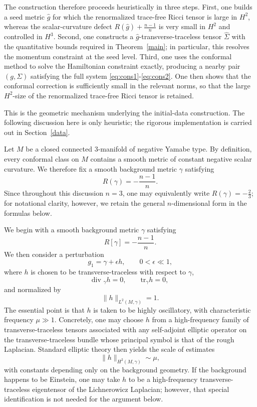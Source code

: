 \documentclass{amsart}
\renewcommand{\div}{\mbox{div }}
\newcommand{\tr}{\mbox{tr}}
\begin{document}
\noindent The construction therefore proceeds heuristically in three steps. First, one builds a seed metric \(\widehat g\) for which the renormalized trace-free Ricci tensor is large in \(H^{2}\), whereas the scalar-curvature defect \(R(\widehat g)+\frac{n-1}{n}\) is very small in \(H^{2}\) and controlled in \(H^{3}\). Second, one constructs a \(\widehat g\)-transverse-traceless tensor \(\widehat\Sigma\) with the quantitative bounds required in Theorem~\ref{main}; in particular, this resolves the momentum constraint at the seed level. Third, one uses the conformal method to solve the Hamiltonian constraint exactly, producing a nearby pair \((g,\Sigma)\) satisfying the full system \eqref{eq:cons1}-\eqref{eq:cons2}. One then shows that the conformal correction is sufficiently small in the relevant norms, so that the large \(H^{2}\)-size of the renormalized trace-free Ricci tensor is retained.



\noindent This is the geometric mechanism underlying the initial-data construction. The following discussion here is only heuristic; the rigorous implementation is carried out in Section~\ref{data}.


\noindent Let $M$ be a closed connected $3$-manifold of negative Yamabe type. By definition, every conformal class on $M$ contains a smooth metric of constant negative scalar curvature. We therefore fix a smooth background metric $\gamma$ satisfying
\[
R(\gamma)=-\frac{n-1}{n}.
\]
Since throughout this discussion $n=3$, one may equivalently write $R(\gamma)=-\frac23$; for notational clarity, however, we retain the general $n$-dimensional form in the formulas below.

\noindent We begin with a smooth background metric $\gamma$ satisfying
\[
R[\gamma]=-\frac{n-1}{n}.
\]
We then consider a perturbation
\[
g_{1}=\gamma+\epsilon h,\qquad 0<\epsilon\ll 1,
\]
where $h$ is chosen to be transverse-traceless with respect to $\gamma$,
\[
\div_{\gamma}h=0,
\qquad
\tr_{\gamma}h=0,
\]
and normalized by
\[
\|h\|_{L^{2}(M,\gamma)}=1.
\]
The essential point is that $h$ is taken to be highly oscillatory, with characteristic frequency $\mu\gg1$. Concretely, one may choose $h$ from a high-frequency family of transverse-traceless tensors associated with any self-adjoint elliptic operator on the transverse-traceless bundle whose principal symbol is that of the rough Laplacian. Standard elliptic theory then yields the scale of estimates
\[
\|h\|_{H^{2}(M,\gamma)}\sim \mu,
\]
with constants depending only on the background geometry. If the background happens to be Einstein, one may take $h$ to be a high-frequency transverse-traceless eigentensor of the Lichnerowicz Laplacian; however, that special identification is not needed for the argument below.
\end{document}
